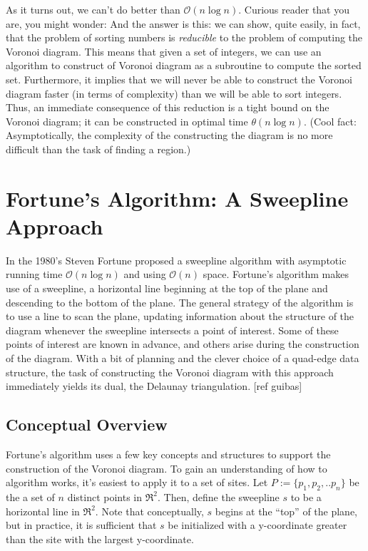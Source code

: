 \documentclass[12pt,twoside]{reedthesis}
\begin{document}
  As it turns out, we can't do better than $\mathcal{O}(n\log n)$. Curious reader that you are, you might wonder:  And the answer is this: we can show, quite easily, in fact, that the problem of sorting numbers is \emph{reducible} to the problem of computing the Voronoi diagram. This means that given a set of integers, we can use an algorithm to construct of Voronoi diagram as a subroutine to compute the sorted set. Furthermore, it implies that we will never be able to construct the Voronoi diagram faster (in terms of complexity) than we will be able to sort integers. Thus, an immediate consequence of this reduction is a tight bound on the Voronoi diagram; it can be constructed in optimal time $\theta(n\log n)$. (Cool fact: Asymptotically, the complexity of the constructing the diagram is no more difficult than the task of finding a region.)\par
  

  \section{Fortune's Algorithm: A Sweepline Approach} %
  \label{sec:fortune_s_algorithm}
  In the 1980's Steven Fortune proposed a sweepline algorithm with asymptotic running time $\mathcal{O}(n\log n)$ and using $\mathcal{O}(n)$ space. Fortune's algorithm makes use of a sweepline, a horizontal line beginning at the top of the plane and descending to the bottom of the plane. The general strategy of the algorithm is to use a line to scan the plane, updating information about the structure of the diagram whenever the sweepline intersects a point of interest. Some of these points of interest are known in advance, and others arise during the construction of the diagram. With a bit of planning and the clever choice of a quad-edge data structure, the task of constructing the Voronoi diagram with this approach immediately yields its dual, the Delaunay triangulation. [ref guibas]

  \subsection{Conceptual Overview} %
  \label{sub:conceptual_overview}
  Fortune's algorithm uses a few key concepts and structures to support the construction of the Voronoi diagram. To gain an understanding of how to algorithm works, it's easiest to apply it to a set of sites. Let $P:=\{p_{1}, p_{2}, .. p_{n}\}$ be the a set of $n$ distinct points in $\Re^{2}$. Then, define the sweepline $s$ to be a horizontal line in $\Re^{2}$. Note that conceptually, $s$ begins at the ``top'' of the plane, but in practice, it is sufficient that $s$ be initialized with a y-coordinate greater than the site with the largest y-coordinate.\par
\end{document}
